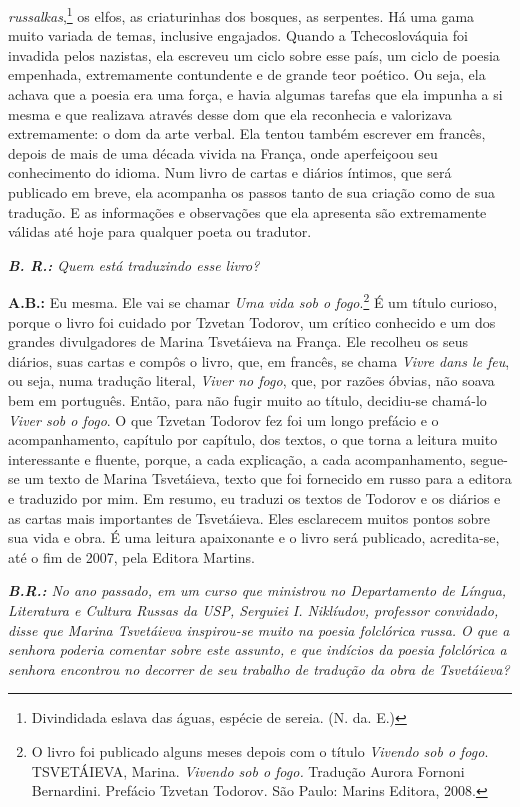\emph{russalkas},\footnote{Divindidada eslava das águas, espécie de
  sereia. (N. da. E.)} os elfos, as criaturinhas dos bosques, as
serpentes. Há uma gama muito variada de temas, inclusive engajados.
Quando a Tchecoslováquia foi invadida pelos nazistas, ela escreveu um
ciclo sobre esse país, um ciclo de poesia empenhada, extremamente
contundente e de grande teor poético. Ou seja, ela achava que a poesia
era uma força, e havia algumas tarefas que ela impunha a si mesma e que
realizava através desse dom que ela reconhecia e valorizava
extremamente: o dom da arte verbal. Ela tentou também escrever em
francês, depois de mais de uma década vivida na França, onde aperfeiçoou
seu conhecimento do idioma. Num livro de cartas e diários íntimos, que
será publicado em breve, ela acompanha os passos tanto de sua criação
como de sua tradução. E as informações e observações que ela apresenta
são extremamente válidas até hoje para qualquer poeta ou tradutor.

\emph{\textbf{B. R.:} Quem está traduzindo esse livro?}

\textbf{A.B.:} Eu mesma. Ele vai se chamar \emph{Uma vida sob o
fogo}.\footnote{O livro foi publicado alguns meses depois com o título
  \emph{Vivendo sob o fogo}. TSVETÁIEVA, Marina. \emph{Vivendo sob o
  fogo.} Tradução Aurora Fornoni Bernardini. Prefácio Tzvetan Todorov.
  São Paulo: Marins Editora, 2008.} É um título curioso, porque o livro
foi cuidado por Tzvetan Todorov, um crítico conhecido e um dos grandes
divulgadores de Marina Tsvetáieva na França. Ele recolheu os seus
diários, suas cartas e compôs o livro, que, em francês, se chama
\emph{Vivre dans le feu}, ou seja, numa tradução literal, \emph{Viver no
fogo}, que, por razões óbvias, não soava bem em português. Então, para
não fugir muito ao título, decidiu-se chamá-lo \emph{Viver sob o fogo}.
O que Tzvetan Todorov fez foi um longo prefácio e o acompanhamento,
capítulo por capítulo, dos textos, o que torna a leitura muito
interessante e fluente, porque, a cada explicação, a cada
acompanhamento, segue-se um texto de Marina Tsvetáieva, texto que foi
fornecido em russo para a editora e traduzido por mim. Em resumo, eu
traduzi os textos de Todorov e os diários e as cartas mais importantes
de Tsvetáieva. Eles esclarecem muitos pontos sobre sua vida e obra. É
uma leitura apaixonante e o livro será publicado, acredita-se, até o fim
de 2007, pela Editora Martins.

\emph{\textbf{B.R.:} No ano passado, em um curso que ministrou no
Departamento de Língua, Literatura e Cultura Russas da USP, Serguiei I.
Niklíudov, professor convidado, disse que Marina Tsvetáieva inspirou-se
muito na poesia folclórica russa. O que a senhora poderia comentar sobre
este assunto, e que indícios da poesia folclórica a senhora encontrou no
decorrer de seu trabalho de tradução da obra de Tsvetáieva?}

